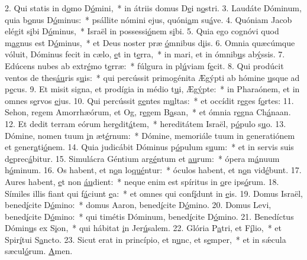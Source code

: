 2. Qui statis in d\uline{o}mo D\uline{ó}mini,~* in átriis domus D\uline{e}i n\uline{o}stri.
3. Laudáte Dóminum, quia b\uline{o}nus D\uline{ó}minus:~* psállite nómini ejus, quóni\uline{a}m su\uline{á}ve.
4. Quóniam Jacob elégit s\uline{i}bi D\uline{ó}minus,~* Israël in possessi\uline{ó}nem s\uline{i}bi.
5. Quia ego cognóvi quod m\uline{a}gnus est D\uline{ó}minus,~* et Deus noster præ \uline{ó}mnibus d\uline{i}is.
6. Omnia quæcúmque vóluit, Dóminus fecit in cælo, \uline{e}t in t\uline{e}rra,~* in mari, et in ómnib\uline{u}s ab\uline{ý}ssis.
7. Edúcens nubes ab extr\uline{é}mo t\uline{e}rræ:~* fúlgura in pl\uline{ú}viam f\uline{e}cit.
8. Qui prodúcit ventos de thes\uline{áu}ris s\uline{u}is:~* qui percússit primogénita Ægýpti ab hómine \uline{u}sque ad p\uline{e}cus.
9. Et misit signa, et prodígia in médio t\uline{u}i, Æg\uline{ý}pte:~* in Pharaónem, et in omnes s\uline{e}rvos \uline{e}jus.
10. Qui percússit g\uline{e}ntes m\uline{u}ltas:~* et occídit r\uline{e}ges f\uline{o}rtes:
11. Sehon, regem Amorrhæórum, et Og, r\uline{e}gem B\uline{a}san,~* et ómnia r\uline{e}gna Ch\uline{á}naan.
12. Et dedit terram eórum her\uline{e}dit\uline{á}tem,~* hereditátem Israël, p\uline{ó}pulo s\uline{u}o.
13. Dómine, nomen tuum \uline{i}n æt\uline{é}rnum:~* Dómine, memoriále tuum in generatiónem et gener\uline{a}ti\uline{ó}nem.
14. Quia judicábit Dóminus p\uline{ó}pulum s\uline{u}um:~* et in servis suis d\uline{e}prec\uline{á}bitur.
15. Simulácra Géntium arg\uline{é}ntum et \uline{au}rum:~* ópera m\uline{á}nuum h\uline{ó}minum.
16. Os habent, et n\uline{o}n lo\uline{qué}ntur:~* óculos habent, et n\uline{o}n vid\uline{é}bunt.
17. Aures habent, \uline{e}t non \uline{áu}dient:~* neque enim est spíritus in \uline{o}re ips\uline{ó}rum.
18. Símiles illis fiant qui f\uline{á}ciunt \uline{e}a:~* et omnes qui conf\uline{í}dunt in \uline{e}is.
19. Domus Israël, bened\uline{í}cite D\uline{ó}mino:~* domus Aaron, bened\uline{í}cite D\uline{ó}mino.
20. Domus Levi, bened\uline{í}cite D\uline{ó}mino:~* qui timétis Dóminum, bened\uline{í}cite D\uline{ó}mino.
21. Benedíctus Dómin\uline{u}s ex S\uline{i}on,~* qui hábitat \uline{i}n Jer\uline{ú}salem.
22. Glória P\uline{a}tri, et F\uline{í}lio,~* et Spir\uline{í}tui S\uline{a}ncto.
23. Sicut erat in princípio, et n\uline{u}nc, et s\uline{e}mper,~* et in sǽcula sæcul\uline{ó}rum. \uline{A}men.
